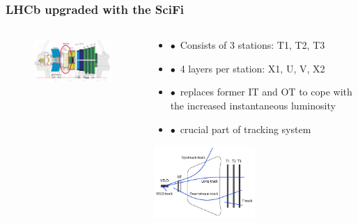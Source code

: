 \documentclass[aspectratio=1610, 12pt, xcolor=dvipsnames]{beamer}
\begin{document}
\begin{frame}\frametitle{LHCb upgraded with the SciFi}
  \begin{columns}
    \begin{column}[c]{0.48\textwidth}
      \begin{figure}
        \includegraphics[width=\textwidth]{logos/upgrade_lhcb.png}
      \end{figure}
    \end{column}
    \begin{column}{0.48\textwidth}
      \begin{itemize}
        \item $\bullet$\, Consists of 3 stations: T1, T2, T3
        \item $\bullet$\, 4 layers per station: X1, U, V, X2
      	\item $\bullet$\, replaces former IT and OT to cope with the increased instantaneous luminosity
	      \item $\bullet$\, crucial part of tracking system
      \end{itemize}
      \includegraphics[width=0.5\textwidth]{track.png}
    \end{column}
  \end{columns}
\end{frame}
\end{document}
